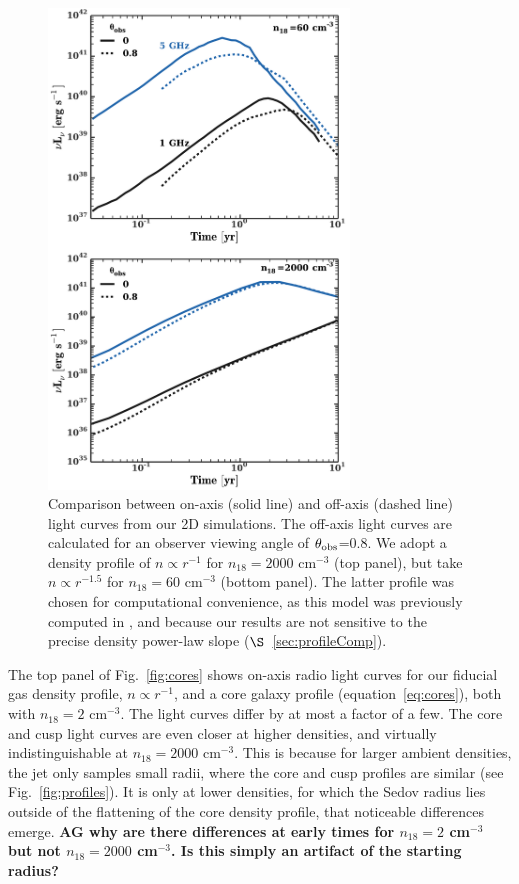 \documentclass[usenatbib,fleqn]{mnras}
\begin{document}
\begin{figure}
\includegraphics[width=8cm]{on_off.pdf}
\caption{\label{fig:onOff} Comparison between on-axis (solid line) and
  off-axis (dashed line) light curves from our 2D simulations.  The
  off-axis light curves are calculated for an observer viewing angle
  of $\theta_{\rm obs}$=0.8.  We adopt a density profile of $n\propto
  r^{-1}$ for $n_{18}=2000$ cm$^{-3}$ (top panel), but take $n\propto
  r^{-1.5}$ for $n_{18}=60$ cm$^{-3}$ (bottom panel).  The latter
  profile was chosen for computational convenience, as this model was
  previously computed in \citet{Mimica+2015}, and because our results
  are not sensitive to the precise density power-law slope
  ($\S$~\ref{sec:profileComp}).}
\end{figure}

\label{sec:profileComp}
The top panel of Fig.~\ref{fig:cores} shows on-axis radio light curves
for our fiducial gas density profile, $n\propto r^{-1}$, and a core
galaxy profile (equation~\ref{eq:cores}), both with $n_{18}=2$
cm$^{-3}$.  The light curves differ by at most a factor of a few. The
core and cusp light curves are even closer at higher densities, and
virtually indistinguishable at $n_{18}=2000$ cm$^{-3}$. This is
because for larger ambient densities, the jet only samples small
radii, where the core and cusp profiles are similar (see
Fig.~\ref{fig:profiles}). It is only at lower densities, for which the
Sedov radius lies outside of the flattening of the core density
profile, that noticeable differences emerge. {\bf AG why are there
  differences at early times for $n_{18}=2$ cm$^{-3}$ but not
  $n_{18}=2000$ cm$^{-3}$. Is this simply an artifact of the starting
  radius?}
\end{document}
